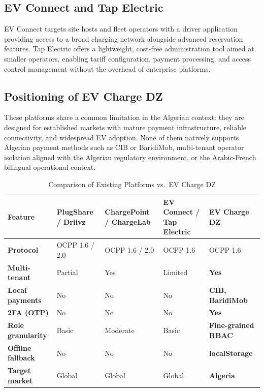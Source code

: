 \documentclass[12pt,a4paper]{report}
\begin{document}
\subsection{EV Connect and Tap Electric}

EV Connect targets site hosts and fleet operators with a driver application providing
access to a broad charging network alongside advanced reservation features. Tap Electric
offers a lightweight, cost-free administration tool aimed at smaller operators, enabling
tariff configuration, payment processing, and access control management without the
overhead of enterprise platforms.

\subsection{Positioning of EV Charge DZ}

These platforms share a common limitation in the Algerian context: they are designed for
established markets with mature payment infrastructure, reliable connectivity, and
widespread EV adoption. None of them natively supports Algerian payment methods such as
CIB or BaridiMob, multi-tenant operator isolation aligned with the Algerian regulatory
environment, or the Arabic-French bilingual operational context.

\begin{table}[h!]
  \centering
  \caption{Comparison of Existing Platforms vs.\ EV Charge DZ}
  \label{tab:platform-comparison}
  \renewcommand{\arraystretch}{1.3}
  \begin{tabularx}{\textwidth}{>{\bfseries}p{3.2cm} X X X X}
    \toprule
    Feature
      & PlugShare / Driivz
      & ChargePoint / ChargeLab
      & EV Connect / Tap Electric
      & \textbf{EV Charge DZ} \\
    \midrule
    Protocol         & OCPP 1.6 / 2.0  & OCPP 1.6 / 2.0  & OCPP 1.6        & OCPP 1.6 \\
    Multi-tenant     & Partial          & Yes             & Limited         & \textbf{Yes} \\
    Local payments   & No               & No              & No              & \textbf{CIB, BaridiMob} \\
    2FA (OTP)        & No               & No              & No              & \textbf{Yes} \\
    Role granularity & Basic            & Moderate        & Basic           & \textbf{Fine-grained RBAC} \\
    Offline fallback & No               & No              & No              & \textbf{localStorage} \\
    Target market    & Global           & Global          & Global          & \textbf{Algeria} \\
    \bottomrule
  \end{tabularx}
\end{table}
\end{document}
